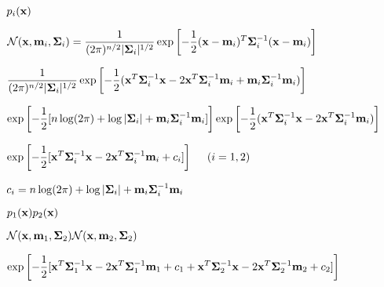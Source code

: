 \documentclass{article}
\def\lthtmlcheckvsize{\ifdim\ht\sizebox<\vsize 
  \ifdim\wd\sizebox<\hsize\expandafter\hfill\fi \expandafter\vfill
  \else\expandafter\vss\fi}%
\begin{document}
{\newpage\clearpage
{}%
$\displaystyle p_i({\bf x})$%
\lthtmlindisplaymathZ
\lthtmlcheckvsize\clearpage}

{\newpage\clearpage
{}%
$\displaystyle {\cal N}({\bf x},{\bf m}_i,{\bf\Sigma}_i)
=\frac{1}{(2\pi)^{n/2}|{\bf\Sigma}_i|^{1/2}}
\exp\left[-\frac{1}{2}({\bf x}-{\bf m}_i)^T{\bf\Sigma}_i^{-1}({\bf x}-{\bf m}_i)\right]$%
\lthtmlindisplaymathZ
\lthtmlcheckvsize\clearpage}

{\newpage\clearpage
{}%
$\displaystyle \frac{1}{(2\pi)^{n/2}|{\bf\Sigma}_i|^{1/2}}
\exp\left[-\frac{1}{2}({\bf x}^T{\bf\Sigma}_i^{-1}{\bf x}
-2{\bf x}^T{\bf\Sigma}_i^{-1}{\bf m}_i+{\bf m}_i{\bf\Sigma}_i^{-1}{\bf m}_i)\right]$%
\lthtmlindisplaymathZ
\lthtmlcheckvsize\clearpage}

{\newpage\clearpage
{}%
$\displaystyle \exp\left[-\frac{1}{2} [n\log(2\pi)+\log|{\bf\Sigma}_i|+{\bf m}_i{\bf\Sigma}_i^{-1}{\bf m}_i]\right]
\exp\left[-\frac{1}{2}({\bf x}^T{\bf\Sigma}_i^{-1}{\bf x}-2{\bf x}^T{\bf\Sigma}_i^{-1}{\bf m}_i)\right]$%
\lthtmlindisplaymathZ
\lthtmlcheckvsize\clearpage}

{\newpage\clearpage
{}%
$\displaystyle \exp\left[-\frac{1}{2}[{\bf x}^T{\bf\Sigma}_i^{-1}{\bf x}-2{\bf x}^T{\bf\Sigma}_i^{-1}{\bf m}_i+c_i]\right]
\;\;\;\;\;(i=1,2)$%
\lthtmlindisplaymathZ
\lthtmlcheckvsize\clearpage}

{\newpage\clearpage
{}%
$\displaystyle c_i=n\log(2\pi)+\log|{\bf\Sigma}_i|+{\bf m}_i{\bf\Sigma}_i^{-1}{\bf m}_i$%
\lthtmlindisplaymathZ
\lthtmlcheckvsize\clearpage}

{\newpage\clearpage
{}%
$\displaystyle p_1({\bf x}) p_2({\bf x})$%
\lthtmlindisplaymathZ
\lthtmlcheckvsize\clearpage}

{\newpage\clearpage
{}%
$\displaystyle {\cal N}({\bf x},{\bf m}_1,{\bf\Sigma}_2){\cal N}({\bf x},{\bf m}_2,{\bf\Sigma}_2)$%
\lthtmlindisplaymathZ
\lthtmlcheckvsize\clearpage}

{\newpage\clearpage
{}%
$\displaystyle \exp\left[-\frac{1}{2}
[ {\bf x}^T{\bf\Sigma}_1^{-1}{\bf x}-2{\bf x}^T{\bf\Sigma}_1^{-1}{\bf m}_1+c_1
+{\bf x}^T{\bf\Sigma}_2^{-1}{\bf x}-2{\bf x}^T{\bf\Sigma}_2^{-1}{\bf m}_2+c_2]
\right]$%
\lthtmlindisplaymathZ
\lthtmlcheckvsize\clearpage}
\end{document}

